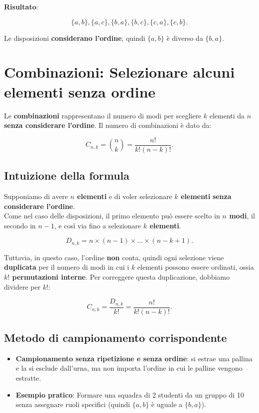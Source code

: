 \documentclass[
  italian,
  letterpaper,
  a4paper,
  11pt,
  open=any]{scrbook}
\providecommand{\tightlist}{%
  \setlength{\itemsep}{0pt}\setlength{\parskip}{0pt}}
\theoremstyle{plain}
\theoremstyle{definition}
\theoremstyle{definition}
\theoremstyle{remark}
\begin{document}
\textbf{Risultato}:

\[
\{a, b\}, \{a, c\}, \{b, a\}, \{b, c\}, \{c, a\}, \{c, b\}.
\]

Le disposizioni \textbf{considerano l'ordine}, quindi \(\{a, b\}\) è
diverso da \(\{b, a\}\).

\section{Combinazioni: Selezionare alcuni elementi senza
ordine}\label{combinazioni-selezionare-alcuni-elementi-senza-ordine}

Le \textbf{combinazioni} rappresentano il numero di modi per scegliere
\(k\) elementi da \(n\) \textbf{senza considerare l'ordine}. Il numero
di combinazioni è dato da:

\[
C_{n,k} = \binom{n}{k} = \frac{n!}{k!(n-k)!} .
\]

\subsection{Intuizione della formula}\label{intuizione-della-formula-2}

Supponiamo di avere \textbf{\(n\) elementi} e di voler selezionare
\textbf{\(k\) elementi} \textbf{senza considerare l'ordine}.\\
Come nel caso delle disposizioni, il primo elemento può essere scelto in
\textbf{\(n\) modi}, il secondo in \textbf{\(n-1\)}, e così via fino a
selezionare \textbf{\(k\) elementi}.

\[
D_{n,k} = n \times (n-1) \times \dots \times (n-k+1) .
\]

Tuttavia, in questo caso, l'ordine \textbf{non} conta, quindi ogni
selezione viene \textbf{duplicata} per il numero di modi in cui i \(k\)
elementi possono essere ordinati, ossia \textbf{\(k!\) permutazioni
interne}. Per correggere questa duplicazione, dobbiamo dividere per
\(k!\):

\[
C_{n,k} = \frac{D_{n,k}}{k!} = \frac{n!}{k!(n-k)!} .
\]

\subsection{Metodo di campionamento
corrispondente}\label{metodo-di-campionamento-corrispondente-2}

\begin{itemize}
\tightlist
\item
  \textbf{Campionamento senza ripetizione e senza ordine}: si estrae una
  pallina e la si esclude dall'urna, ma non importa l'ordine in cui le
  palline vengono estratte.\\
\item
  \textbf{Esempio pratico}: Formare una squadra di 2 studenti da un
  gruppo di 10 senza assegnare ruoli specifici (quindi \(\{a, b\}\) è
  uguale a \(\{b, a\}\)).
\end{itemize}
\end{document}
